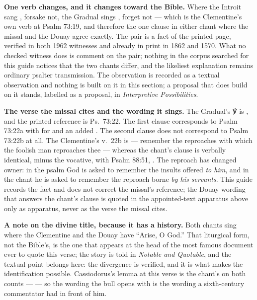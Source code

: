 \textbf{One verb changes, and it changes toward the Bible.} Where the Introit
sang , forsake not, the Gradual sings , forget not --- which is the Clementine's own verb at Psalm
73:19, and therefore the one clause in either chant where the missal and the
Douay agree exactly. The pair is a fact of the printed page, verified in both
1962 witnesses and already in print in 1862 and 1570. What no checked witness
does is comment on the pair; nothing in the corpus searched for this guide
notices that the two chants differ, and the likeliest explanation remains
ordinary psalter transmission. The observation is recorded as a textual
observation and nothing is built on it in this section; a proposal that does
build on it stands, labelled as a proposal, in \textit{Interpretive
Possibilities}.

\textbf{The verse the missal cites and the wording it sings.} The Gradual's
℣ is , and the printed reference is Ps.\ 73:22. The first clause
corresponds to Psalm 73:22a with  for  and an added
. The second clause does not correspond to Psalm 73:22b at all. The
Clementine's v.~22b is  --- remember the reproaches with which the foolish
man reproaches thee --- whereas the chant's clause is verbally identical,
minus the vocative, with Psalm 88:51, . The reproach has changed owner: in the psalm God is asked to
remember the insults offered \textit{to him}, and in the chant he is asked to
remember the reproach borne \textit{by his servants}. This guide records the
fact and does not correct the missal's reference; the Douay wording that
answers the chant's clause is quoted in the appointed-text apparatus above only
as apparatus, never as the verse the missal cites.

\textbf{A note on the divine title, because it has a history.} Both chants sing
 where the Clementine and the Douay have ``Arise, O
God.'' That liturgical form, not the Bible's, is the one that appears at the
head of the most famous document ever to quote this verse; the story is told
in \textit{Notable and Quotable}, and the textual point belongs here: the
divergence is verified, and it is what makes the identification possible.
Cassiodorus's lemma at this verse is the chant's on both counts ---
 --- so the wording the bull opens
with is the wording a sixth-century commentator had in front of him.

